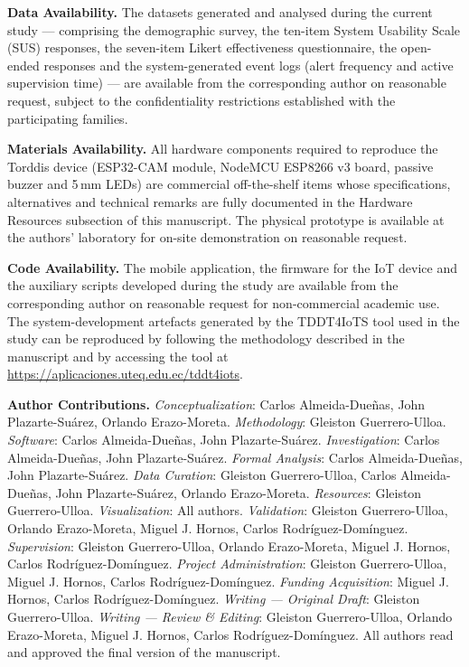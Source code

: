 \documentclass[pdflatex,sn-apa]{sn-jnl}%
\begin{document}
    \textbf{Data Availability.}
        The datasets generated and analysed during the current study --- comprising the demographic survey, the ten-item System Usability Scale (SUS) responses, the seven-item Likert effectiveness questionnaire, the open-ended responses and the system-generated event logs (alert frequency and active supervision time) --- are available from the corresponding author on reasonable request, subject to the confidentiality restrictions established with the participating families.

    \textbf{Materials Availability.}
        All hardware components required to reproduce the Torddis device (ESP32-CAM module, NodeMCU ESP8266 v3 board, passive buzzer and 5\,mm LEDs) are commercial off-the-shelf items whose specifications, alternatives and technical remarks are fully documented in the Hardware Resources subsection of this manuscript. The physical prototype is available at the authors' laboratory for on-site demonstration on reasonable request.

    \textbf{Code Availability.}
        The mobile application, the firmware for the IoT device and the auxiliary scripts developed during the study are available from the corresponding author on reasonable request for non-commercial academic use. The system-development artefacts generated by the TDDT4IoTS tool used in the study can be reproduced by following the methodology described in the manuscript and by accessing the tool at \url{https://aplicaciones.uteq.edu.ec/tddt4iots}.

    \textbf{Author Contributions.}
        \emph{Conceptualization}: Carlos Almeida-Due\~nas, John Plazarte-Su\'arez, Orlando Erazo-Moreta.
        \emph{Methodology}: Gleiston Guerrero-Ulloa.
        \emph{Software}: Carlos Almeida-Due\~nas, John Plazarte-Su\'arez.
        \emph{Investigation}: Carlos Almeida-Due\~nas, John Plazarte-Su\'arez.
        \emph{Formal Analysis}: Carlos Almeida-Due\~nas, John Plazarte-Su\'arez.
        \emph{Data Curation}: Gleiston Guerrero-Ulloa, Carlos Almeida-Due\~nas, John Plazarte-Su\'arez, Orlando Erazo-Moreta.
        \emph{Resources}: Gleiston Guerrero-Ulloa.
        \emph{Visualization}: All authors.
        \emph{Validation}: Gleiston Guerrero-Ulloa, Orlando Erazo-Moreta, Miguel J. Hornos, Carlos Rodr\'iguez-Dom\'inguez.
        \emph{Supervision}: Gleiston Guerrero-Ulloa, Orlando Erazo-Moreta, Miguel J. Hornos, Carlos Rodr\'iguez-Dom\'inguez.
        \emph{Project Administration}: Gleiston Guerrero-Ulloa, Miguel J. Hornos, Carlos Rodr\'iguez-Dom\'inguez.
        \emph{Funding Acquisition}: Miguel J. Hornos, Carlos Rodr\'iguez-Dom\'inguez.
        \emph{Writing --- Original Draft}: Gleiston Guerrero-Ulloa.
        \emph{Writing --- Review \& Editing}: Gleiston Guerrero-Ulloa, Orlando Erazo-Moreta, Miguel J. Hornos, Carlos Rodr\'iguez-Dom\'inguez.
        All authors read and approved the final version of the manuscript.
\end{document}
